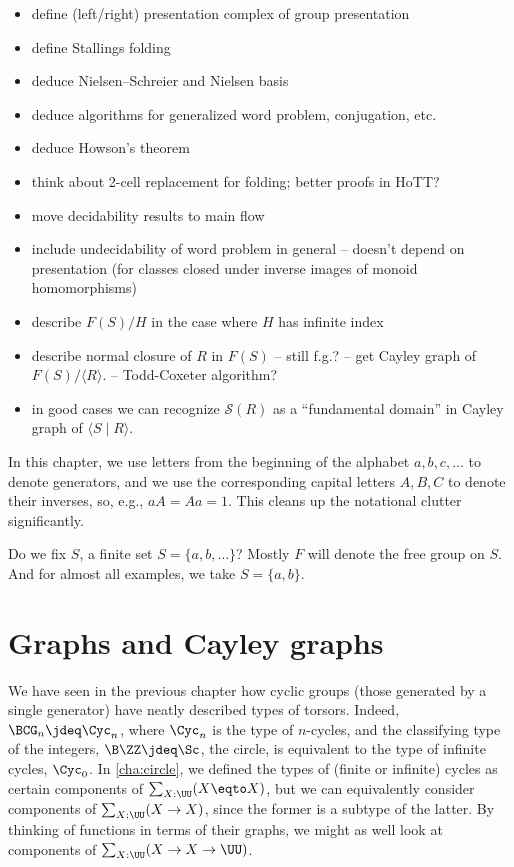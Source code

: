 \begin{itemize}
\item define (left/right) presentation complex of group presentation
\item define Stallings folding
\item deduce Nielsen--Schreier and Nielsen basis
\item deduce algorithms for generalized word problem, conjugation, etc.
\item deduce Howson's theorem
\item think about 2-cell replacement for folding; better proofs in HoTT?
\item move decidability results to main flow
\item include undecidability of word problem in general
  -- doesn't depend on presentation (for classes closed under inverse images of monoid homomorphisms)
\item describe $F(S)/H$ in the case where $H$ has infinite index
\item describe normal closure of $R$ in $F(S)$ -- still f.g.? -- get Cayley graph of $F(S)/\langle R\rangle$. -- Todd-Coxeter algorithm?
\item in good cases we can recognize $\mathcal{S}(R)$ as a ``fundamental domain'' in Cayley graph of $\langle S\mid R\rangle$.
\end{itemize}

\begin{remark}
  In this chapter, we use letters from the
  beginning of the alphabet $a,b,c,\dots$
  to denote generators,
  and we use the corresponding capital letters
  $A,B,C$ to denote their inverses,
  so, e.g., $aA=Aa=1$.
  This cleans up the notational clutter significantly.
\end{remark}

Do we fix $S$, a finite set $S=\{a,b,\ldots\}$?
Mostly $F$ will denote the free group on $S$.
And for almost all examples, we take $S = \{a,b\}$.

\section{Graphs and Cayley graphs}
\label{sec:cayley-graphs}

We have seen in the previous chapter how cyclic groups
(those generated by a single generator)
have neatly described types of torsors.
Indeed, $\BCG_n \jdeq \Cyc_n$, where $\Cyc_n$ is the type of $n$-cycles,
and the classifying type of the integers, $\B\ZZ\jdeq\Sc$, \ie the circle,
is equivalent to the type of infinite cycles, $\Cyc_0$.
In \cref{cha:circle}, we defined the types of (finite or infinite)
cycles as certain components of $\sum_{X:\UU}(X\eqto X)$,
but we can equivalently consider components of $\sum_{X:\UU}(X\to X)$,
since the former is a subtype of the latter.
By thinking of functions in terms of their graphs,
we might as well look at components of $\sum_{X:\UU}(X \to X \to \UU)$.

